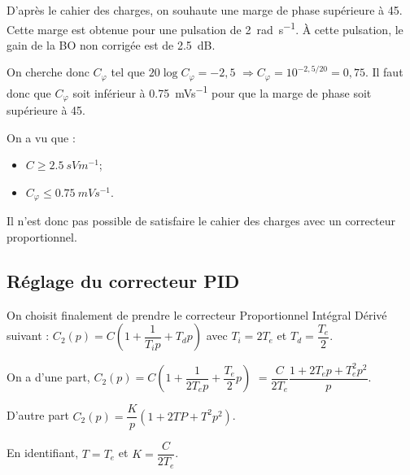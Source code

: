 \ifprof
\begin{corrige}
D'après le cahier des charges, on souhaute une marge de phase supérieure à 45\degres.
Cette marge est obtenue pour une pulsation de \SI{2}{rad.s^{-1}}. À cette pulsation, le gain de la BO non corrigée est de \SI{2,5}{dB}. 

On cherche donc $C_\varphi$ tel que $20\log C_\varphi = -2,5$ $\Rightarrow C_\varphi = 10^{-2,5/20} = 0,75$.
Il faut donc que $C_\varphi$ soit inférieur à \SI{0,75}{mVs^{-1}} pour que la marge de phase soit supérieure à 45\degres.
\end{corrige}
\else
\fi

\ifprof
\begin{corrige}
On a vu que :
\begin{itemize}
\item $C\geq  \SI{2,5}{sVm^{-1}}$;
\item $C_{\varphi} \leq  \SI{0,75}{mVs^{-1}}$.
\end{itemize}

Il n'est donc pas possible de satisfaire le cahier des charges avec un correcteur proportionnel. 

\end{corrige}
\else
\fi

\subsection{Réglage du correcteur PID}
On choisit finalement de prendre le correcteur Proportionnel Intégral Dérivé suivant :
$C_2 (p)=C \left(1+\dfrac{1}{T_i p}+T_d p\right)$ avec $T_i=2 T_e$  et $T_d=\dfrac{T_e}{2}$.

\ifprof
\begin{corrige}
On a d'une part, $C_2 (p)=C \left(1+\dfrac{1}{2 T_e p}+\dfrac{T_e}{2} p\right)$ $=\dfrac{C}{2 T_e }\dfrac{1 +2 T_e p +  T_e^2p^2}{p}$.

D'autre part $C_2 (p)=\dfrac{K}{p} \left(1+2 TP+ T^2 p^2\right)$.

En identifiant, $T=T_e$ et $K = \dfrac{C}{2 T_e }$.
\end{corrige}
\else
\fi

